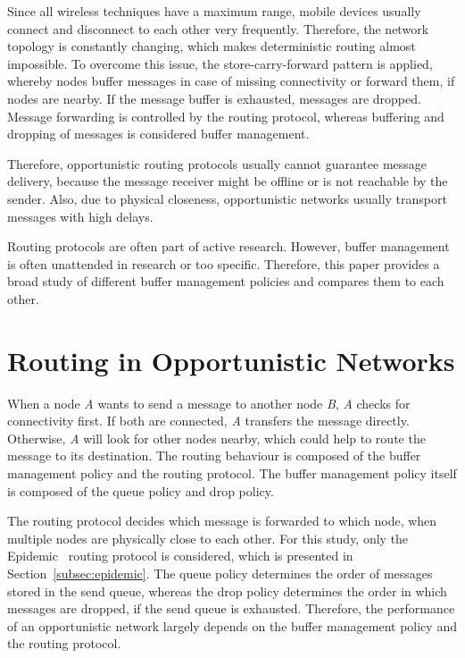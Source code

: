 \documentclass[conference,10pt,letterpaper,final]{IEEEtran}
\begin{document}
Since all wireless techniques have a maximum range, mobile devices usually connect and disconnect to each other very frequently.
Therefore, the network topology is constantly changing, which makes deterministic routing almost impossible.
To overcome this issue, the store-carry-forward pattern is applied, whereby nodes buffer messages in case of missing connectivity or forward them, if nodes are nearby.
If the message buffer is exhausted, messages are dropped.
Message forwarding is controlled by the routing protocol, whereas buffering and dropping of messages is considered buffer management.

Therefore, opportunistic routing protocols usually cannot guarantee message delivery, because the message receiver might be offline or is not reachable by the sender.
Also, due to physical closeness, opportunistic networks usually transport messages with high delays.

Routing protocols are often part of active research.
However, buffer management is often unattended in research or too specific.
Therefore, this paper provides a broad study of different buffer management policies and compares them to each other.

\vspace{0.4cm}

\section{Routing in Opportunistic Networks}
\label{sec:routingoppnets}

When a node \emph{A} wants to send a message to another node \emph{B}, \emph{A} checks for connectivity first.
If both are connected, \emph{A} transfers the message directly.
Otherwise, \emph{A} will look for other nodes nearby, which could help to route the message to its destination.
The routing behaviour is composed of the buffer management policy and the routing protocol.
The buffer management policy itself is composed of the queue policy and drop policy.

The routing protocol decides which message is forwarded to which node, 
when multiple nodes are physically close to each other.
For this study, only the Epidemic~\cite{epidemic} routing protocol is considered, which is presented in Section~\ref{subsec:epidemic}.
The queue policy determines the order of messages stored in the send queue, whereas the drop policy determines the order in which messages are dropped, if the send queue is exhausted.
Therefore, the performance of an opportunistic network largely depends on the buffer management policy and the routing protocol.
\end{document}
